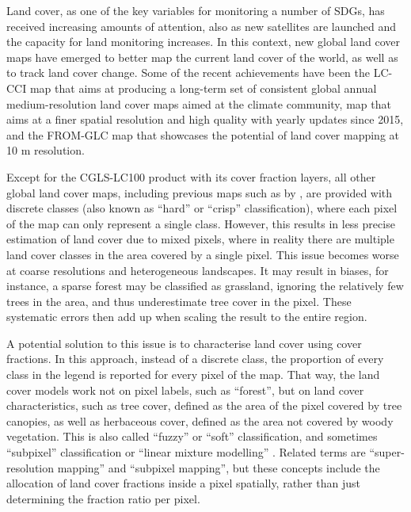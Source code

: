 \documentclass[review,authoryear,3p]{elsarticle}
\begin{document}
Land cover, as one of the key variables for monitoring a number of \glspl{SDG}, has received increasing amounts of attention, also as new satellites are launched and the capacity for land monitoring increases.
In this context, new global land cover maps have emerged to better map the current land cover of the world, as well as to track land cover change.
Some of the recent achievements have been the \ac{LC-CCI} map \citep{esa_land_2017} that aims at producing a long-term set of consistent global annual medium-resolution land cover maps aimed at the climate community,  map \citep{buchhorn_moderate_2019, buchhorn_copernicus_2020} that aims at a finer spatial resolution and high quality with yearly updates since 2015, and the \ac{FROM-GLC} map \citep{fromglc2019} that showcases the potential of land cover mapping at 10 m resolution.

Except for the \ac{CGLS-LC100} product with its cover fraction layers, all other global land cover maps, including previous maps such as by \citet{bartholome2005glc2000, friedl2010modis, arino2007globcover, see2015hybrid, chen2015globeland30}, are provided with discrete classes (also known as ``hard'' or ``crisp'' classification), where each pixel of the map can only represent a single class.
However, this results in less precise estimation of land cover due to mixed pixels, where in reality there are multiple land cover classes in the area covered by a single pixel.
This issue becomes worse at coarse resolutions and heterogeneous landscapes.
It may result in biases, for instance, a sparse forest may be classified as grassland, ignoring the relatively few trees in the area, and thus underestimate tree cover in the pixel.
These systematic errors then add up when scaling the result to the entire region.

A potential solution to this issue is to characterise land cover using cover fractions.
In this approach, instead of a discrete class, the proportion of every class in the legend is reported for every pixel of the map.
That way, the land cover models work not on pixel labels, such as ``forest'', but on land cover characteristics, such as tree cover, defined as the area of the pixel covered by tree canopies, as well as herbaceous cover, defined as the area not covered by woody vegetation.
This is also called ``fuzzy'' or ``soft'' classification, and sometimes ``subpixel'' classification or ``linear mixture modelling'' \citep{Okeke2006fuzzyexponent}.
Related terms are ``super-resolution mapping'' and ``subpixel mapping'', but these concepts include the allocation of land cover fractions inside a pixel spatially, rather than just determining the fraction ratio per pixel.
\end{document}
